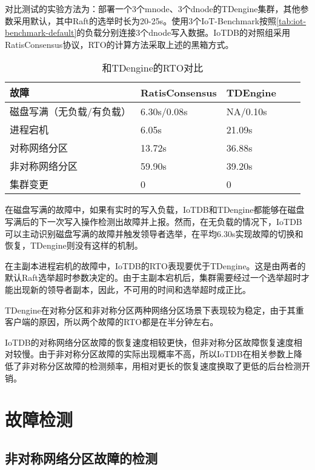 对比测试的实验方法为：部署一个3个mnode、3个dnode的TDengine集群，其他参数采用默认，其中Raft的选举时长为20-25s。使用3个IoT-Benchmark按照\ref{tab:iot-benchmark-default}的负载分别连接3个dnode写入数据。IoTDB的对照组采用RatisConsensus协议，RTO的计算方法采取上述的黑箱方式。

\begin{table}[h!]
    \centering
    \caption{和TDengine的RTO对比}
    \label{tab:exp-rto-compare-tdengine}
    \begin{tabular}{@{}lllll@{}}
        \toprule
        故障 & RatisConsensus & TDEngine \\
        \midrule
        磁盘写满（无负载/有负载） & 6.30s/0.08s & NA/0.10s \\
        进程宕机 & 6.05s & 21.09s \\
        对称网络分区 & 13.72s & 36.88s \\
        非对称网络分区 & 59.90s & 39.20s \\
        集群变更 & 0 & 0 \\
        \bottomrule
    \end{tabular}
  \end{table}

在磁盘写满的故障中，如果有实时的写入负载，IoTDB和TDengine都能够在磁盘写满后的下一次写入操作检测出故障并上报。然而，在无负载的情况下，IoTDB可以主动识别磁盘写满的故障并触发领导者选举，在平均6.30s实现故障的切换和恢复，TDengine则没有这样的机制。

在主副本进程宕机的故障中，IoTDB的RTO表现要优于TDengine。这是由两者的默认Raft选举超时参数决定的。由于主副本宕机后，集群需要经过一个选举超时才能出现新的领导者副本，因此，不可用的时间和选举超时成正比。

TDengine在对称分区和非对称分区两种网络分区场景下表现较为稳定，由于其重客户端的原因，所以两个故障的RTO都是在半分钟左右。

IoTDB的对称网络分区故障的恢复速度相较更快，但非对称分区故障恢复速度相对较慢。由于非对称分区故障的实际出现概率不高，所以IoTDB在相关参数上降低了非对称分区故障的检测频率，用相对更长的恢复速度换取了更低的后台检测开销。


\section{故障检测}

\subsection{非对称网络分区故障的检测}

